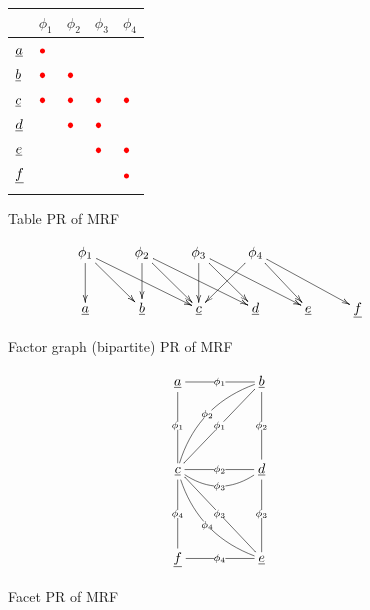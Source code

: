 \begin{figure}[h!]
\centering
\begin{tabular}{lllll}
\hline
\multicolumn{1}{|l|}{} & \multicolumn{1}{l|}{\cellcolor[HTML]{FFCCC9}$\phi_1$} & \multicolumn{1}{l|}{\cellcolor[HTML]{FFCCC9}$\phi_2$} & \multicolumn{1}{l|}{\cellcolor[HTML]{FFCCC9}$\phi_3$} & \multicolumn{1}{l|}{\cellcolor[HTML]{FFCCC9}$\phi_4$} \\ \hline
\multicolumn{1}{|l|}{\cellcolor[HTML]{9AFF99}$\rva$} & \multicolumn{1}{l|}{$\color{red}\bullet$} & \multicolumn{1}{l|}{} & \multicolumn{1}{l|}{} & \multicolumn{1}{l|}{} \\ \hline
\multicolumn{1}{|l|}{\cellcolor[HTML]{9AFF99}$\rvb$} & \multicolumn{1}{l|}{$\color{red}\bullet$} & \multicolumn{1}{l|}{$\color{red}\bullet$} & \multicolumn{1}{l|}{} & \multicolumn{1}{l|}{} \\ \hline
\multicolumn{1}{|l|}{\cellcolor[HTML]{9AFF99}$\rvc$} & \multicolumn{1}{l|}{$\color{red}\bullet$} & \multicolumn{1}{l|}{$\color{red}\bullet$} & \multicolumn{1}{l|}{$\color{red}\bullet$} & \multicolumn{1}{l|}{$\color{red}\bullet$} \\ \hline
\multicolumn{1}{|l|}{\cellcolor[HTML]{9AFF99}$\rvd$} & \multicolumn{1}{l|}{} & \multicolumn{1}{l|}{$\color{red}\bullet$} & \multicolumn{1}{l|}{$\color{red}\bullet$} & \multicolumn{1}{l|}{} \\ \hline
\multicolumn{1}{|l|}{\cellcolor[HTML]{9AFF99}$\rve$} & \multicolumn{1}{l|}{} & \multicolumn{1}{l|}{} & \multicolumn{1}{l|}{$\color{red}\bullet$} & \multicolumn{1}{l|}{$\color{red}\bullet$} \\ \hline
\multicolumn{1}{|l|}{\cellcolor[HTML]{9AFF99}$\rvf$} & \multicolumn{1}{l|}{} & \multicolumn{1}{l|}{} & \multicolumn{1}{l|}{} & \multicolumn{1}{l|}{$\color{red}\bullet$} \\ \hline
 &  &  &  &
\end{tabular}
\caption{Table PR of MRF}
\label{fig-tab-mrf}
\end{figure}


\begin{figure}[h!]
$$
\xymatrix{
\phi_1
\ar[d]\ar[dr]\ar[drr]
&\phi_2
\ar[d]\ar[dr]\ar[drr]
&\phi_3\ar[d]\ar[dr]\ar[drr]
&\phi_4\ar[dr]\ar[drr]\ar[dl]
\\
\rva
&\rvb
&\rvc
&\rvd
&\rve
&\rvf
}
$$
\caption{Factor graph (bipartite)
PR of MRF}
\label{fig-fact-g-mrf}
\end{figure}

\begin{figure}[h!]
$$
\xymatrix@C=4pc@R=4pc{
\rva
\ar@{-}[r]|{\phi_1}
\ar@{-}[d]|{\phi_1}
&{\rvb}
\ar@{-}[d]|{\phi_2}
\ar@{-}[dl]|{\phi_1}
\ar@{-}@/_1pc/[dl]|{\phi_2}
\\
{\rvc}
\ar@{-}[r]|{\phi_2}
\ar@/_1pc/@{-}[r]|{\phi_3}
\ar@{-}[d]|{\phi_4}
\ar@{-}[dr]|{\phi_3}
\ar@{-}@/_1pc/[dr]|{\phi_4}
&{\rvd}
\ar@{-}[d]|{\phi_3}
\\
\rvf
&\rve
\ar@{-}[l]|{\phi_4}
}
$$
\caption{Facet PR of MRF }
\label{fig-facet-mrf}
\end{figure}
